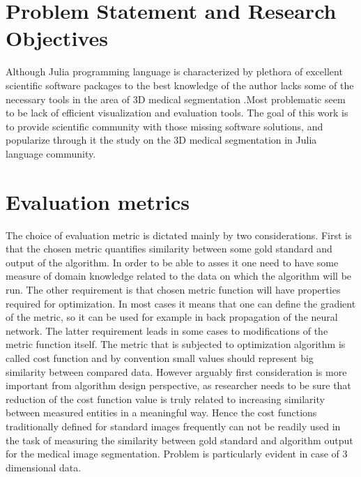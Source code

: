 \documentclass[preprint,12pt]{elsarticle}
\begin{document}
\section{Problem Statement and Research Objectives}
Although Julia programming language is characterized by plethora of excellent scientific software packages to the best knowledge of the author lacks some of the necessary tools in the area of 3D medical segmentation .Most problematic seem to be lack of efficient visualization and evaluation tools. The goal of this work is to provide scientific community with those missing software solutions, and popularize through it the study on the 3D medical segmentation in Julia language community.


\section{Evaluation metrics}

The choice of evaluation metric is dictated mainly by two considerations. First is that the chosen metric quantifies similarity between some gold standard and output of the algorithm. In order to be able to asses it one need to have some measure of domain knowledge related to the data on which the algorithm will be run.  The other requirement is that chosen metric function will have properties required for optimization. In most cases it means that one can define the gradient of the metric, so it can be used for example in back propagation of the neural network. The latter requirement leads in some cases to modifications of the metric function itself. The metric that is subjected to optimization algorithm is called cost function and by convention small values should represent big similarity between compared data.  However arguably first consideration is more important from algorithm design perspective, as researcher needs to be sure that reduction of the cost function value is truly related to increasing similarity between measured entities in a meaningful way. Hence the cost functions traditionally defined for standard images frequently can not be readily used in the task of measuring the similarity between gold standard and algorithm output for the medical image segmentation. Problem is particularly evident in case of 3 dimensional data.
\end{document}
